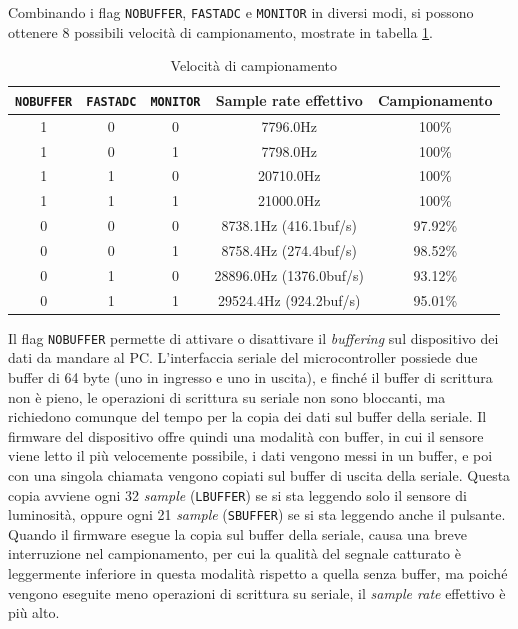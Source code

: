 Combinando i flag \texttt{NOBUFFER}, \texttt{FASTADC} e \texttt{MONITOR} in diversi modi, si possono ottenere 8 possibili velocità di campionamento, mostrate in tabella \ref{tab:openldat_samplerates}.
\begin{table}[h!]
	\centering
	\begin{tabular}{|c|c|c|c|c|} 
		\hline
		\texttt{NOBUFFER} & \texttt{FASTADC} & \texttt{MONITOR} & \textbf{Sample rate effettivo} & \textbf{Campionamento}   \\ 
		\hline
		1 & 0 & 0 & 7796.0Hz & 100\%         \\
		\hline
		1 & 0 & 1 & 7798.0Hz & 100\%         \\
		\hline
		1 & 1 & 0 & 20710.0Hz & 100\%         \\
		\hline
		1 & 1 & 1 & 21000.0Hz & 100\%         \\ 
		\hline
		0 & 0 & 0 & 8738.1Hz (416.1buf/s) & 97.92\%         \\
		\hline
		0 & 0 & 1 & 8758.4Hz (274.4buf/s) & 98.52\%         \\
		\hline
		0 & 1 & 0 & 28896.0Hz (1376.0buf/s) & 93.12\%         \\
		\hline
		0 & 1 & 1 & 29524.4Hz (924.2buf/s) & 95.01\%         \\
		\hline
	\end{tabular}
	\caption{\label{tab:openldat_samplerates}Velocità di campionamento}
\end{table}

Il flag \texttt{NOBUFFER} permette di attivare o disattivare il \textit{buffering} sul dispositivo dei dati da mandare al PC. L'interfaccia seriale del microcontroller possiede due buffer di 64 byte (uno in ingresso e uno in uscita), e finché il buffer di scrittura non è pieno, le operazioni di scrittura su seriale non sono bloccanti, ma richiedono comunque del tempo per la copia dei dati sul buffer della seriale. Il firmware del dispositivo offre quindi una modalità con buffer, in cui il sensore viene letto il più velocemente possibile, i dati vengono messi in un buffer, e poi con una singola chiamata vengono copiati sul buffer di uscita della seriale. Questa copia avviene ogni 32 \textit{sample} (\texttt{LBUFFER}) se si sta leggendo solo il sensore di luminosità, oppure ogni 21 \textit{sample} (\texttt{SBUFFER}) se si sta leggendo anche il pulsante. Quando il firmware esegue la copia sul buffer della seriale, causa una breve interruzione nel campionamento, per cui la qualità del segnale catturato è leggermente inferiore in questa modalità rispetto a quella senza buffer, ma poiché vengono eseguite meno operazioni di scrittura su seriale, il \textit{sample rate} effettivo è più alto.

